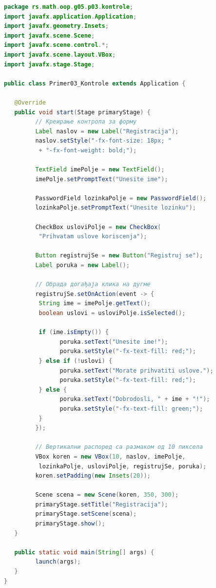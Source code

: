\begin{lstlisting}[language=Java]
package rs.math.oop.g05.p03.kontrole;
import javafx.application.Application;
import javafx.geometry.Insets;
import javafx.scene.Scene;
import javafx.scene.control.*;
import javafx.scene.layout.VBox;
import javafx.stage.Stage;
 
public class Primer03_Kontrole extends Application {
 
   @Override
   public void start(Stage primaryStage) {
         // Креирање контрола за форму
         Label naslov = new Label("Registracija");
         naslov.setStyle("-fx-font-size: 18px; "
          + "-fx-font-weight: bold;");
 
         TextField imePolje = new TextField();
         imePolje.setPromptText("Unesite ime");
 
         PasswordField lozinkaPolje = new PasswordField();
         lozinkaPolje.setPromptText("Unesite lozinku");
 
         CheckBox usloviPolje = new CheckBox(
          "Prihvatam uslove koriscenja");
 
         Button registrujSe = new Button("Registruj se");
         Label poruka = new Label();
 
         // Обрада догађаја клика на дугме
         registrujSe.setOnAction(event -> {
          String ime = imePolje.getText();
          boolean uslovi = usloviPolje.isSelected();
 
          if (ime.isEmpty()) {
                poruka.setText("Unesite ime!");
                poruka.setStyle("-fx-text-fill: red;");
          } else if (!uslovi) {
                poruka.setText("Morate prihvatiti uslove.");
                poruka.setStyle("-fx-text-fill: red;");
          } else {
                poruka.setText("Dobrodosli, " + ime + "!");
                poruka.setStyle("-fx-text-fill: green;");
          }
         });
 
         // Вертикални распоред са размаком од 10 пиксела
         VBox koren = new VBox(10, naslov, imePolje,
          lozinkaPolje, usloviPolje, registrujSe, poruka);
         koren.setPadding(new Insets(20));
 
         Scene scena = new Scene(koren, 350, 300);
         primaryStage.setTitle("Registracija");
         primaryStage.setScene(scena);
         primaryStage.show();
   }
 
   public static void main(String[] args) {
         launch(args);
   }
}
\end{lstlisting}


